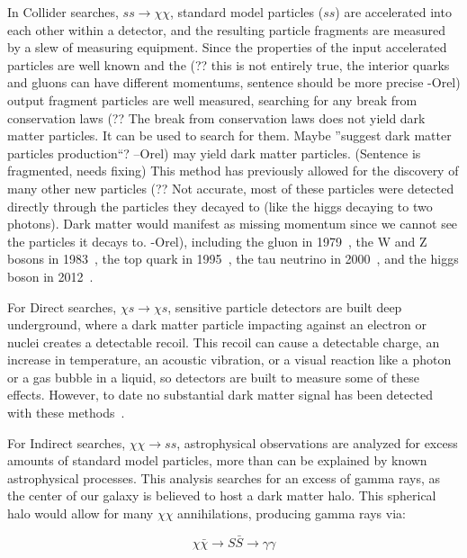     In Collider searches, $ss \rightarrow \chi\chi$, standard model particles ($ss$) are accelerated into each other within a detector, and the resulting particle fragments are measured by a slew of measuring equipment.
    {\color{red}Since the properties of the input accelerated particles are well known and the (?? this is not entirely true, the interior quarks and gluons can have different momentums, sentence should be more precise -Orel)} output fragment particles are well measured, searching for any break from {\color{red}conservation laws (?? The break from conservation laws does not yield dark matter particles. It can be used to search for them. Maybe ''suggest dark matter particles production``? --Orel)} may yield dark matter particles. {\color{red}(Sentence is fragmented, needs fixing)}
    {\color{red}This method has previously allowed for the discovery of many other new particles (?? Not accurate, most of these particles were detected directly through the particles they decayed to (like the higgs decaying to two photons). Dark matter would manifest as missing momentum since we cannot see the particles it decays to. -Orel)}, including the gluon in 1979~\cite{gluon_discovery}, the W and Z bosons in 1983~\cite{WZ_discovery1,WZ_discovery2}, the top quark in 1995~\cite{top_discovery}, the tau neutrino in 2000~\cite{tau_neutrino_discovery}, and the higgs boson in 2012~\cite{Higgs_ATLAS,Higgs_CMS}.

    For Direct searches, $\chi s \rightarrow \chi s$, sensitive particle detectors are built deep underground, where a dark matter particle impacting against an electron or nuclei creates a detectable recoil.
    This recoil can cause a detectable charge, an increase in temperature, an acoustic vibration, or a visual reaction like a photon or a gas bubble in a liquid, so detectors are built to measure some of these effects.
    However, to date no substantial dark matter signal has been detected with these methods~\cite{direct_dm_detection}.

    For Indirect searches, $\chi\chi \rightarrow ss$, astrophysical observations are analyzed for excess amounts of standard model particles, more than can be explained by known astrophysical processes.
    This analysis searches for an excess of gamma rays, as the center of our galaxy is believed to host a dark matter halo.
    This spherical halo would allow for many $\chi\chi$ annihilations, producing gamma rays via: 

    $$\chi\bar{\chi} \rightarrow S\bar{S} \rightarrow \gamma\gamma$$


